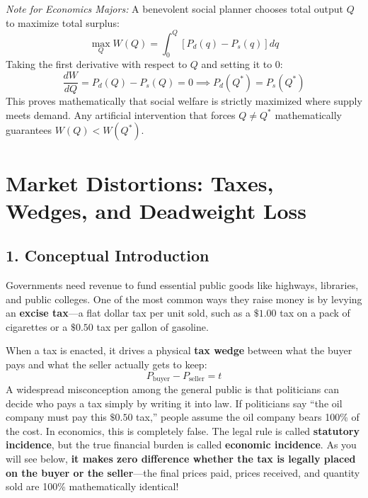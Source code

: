 \documentclass[11pt,letterpaper]{article}
\begin{document}
\begin{tcolorbox}[colback=gray!5!white,colframe=gray!75!black,title=\textbf{Optional Advanced Section: Social Planner Maximization}]
\small
\emph{Note for Economics Majors:} 
A benevolent social planner chooses total output $Q$ to maximize total surplus:
\[
\max_Q W(Q) = \int_{0}^{Q} \left[ P_d(q) - P_s(q) \right] dq
\]
Taking the first derivative with respect to $Q$ and setting it to 0:
\[
\frac{dW}{dQ} = P_d(Q) - P_s(Q) = 0 \implies P_d(Q^*) = P_s(Q^*)
\]
This proves mathematically that social welfare is strictly maximized where supply meets demand. Any artificial intervention that forces $Q \neq Q^*$ mathematically guarantees $W(Q) < W(Q^*)$.
\end{tcolorbox}

\section{Market Distortions: Taxes, Wedges, and Deadweight Loss}

\subsection*{1. Conceptual Introduction}
Governments need revenue to fund essential public goods like highways, libraries, and public colleges. One of the most common ways they raise money is by levying an \textbf{excise tax}—a flat dollar tax per unit sold, such as a $\$1.00$ tax on a pack of cigarettes or a $\$0.50$ tax per gallon of gasoline.

When a tax is enacted, it drives a physical \textbf{tax wedge} between what the buyer pays and what the seller actually gets to keep:
\begin{equation}
P_{\text{buyer}} - P_{\text{seller}} = t
\end{equation}
A widespread misconception among the general public is that politicians can decide who pays a tax simply by writing it into law. If politicians say ``the oil company must pay this $\$0.50$ tax,'' people assume the oil company bears 100\% of the cost. In economics, this is completely false. The legal rule is called \textbf{statutory incidence}, but the true financial burden is called \textbf{economic incidence}. As you will see below, \textbf{it makes zero difference whether the tax is legally placed on the buyer or the seller}—the final prices paid, prices received, and quantity sold are 100\% mathematically identical!
\end{document}
